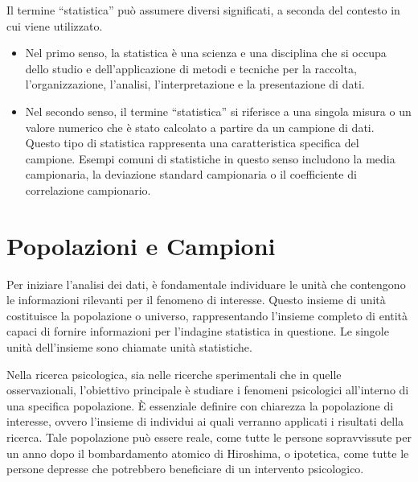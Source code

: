 \documentclass[
  letterpaper,
  krantz2]{{[}./krantz{]}}
\providecommand{\tightlist}{%
  \setlength{\itemsep}{0pt}\setlength{\parskip}{0pt}}\usepackage{longtable,booktabs,array}
\begin{document}
\begin{tcolorbox}[enhanced jigsaw, opacityback=0, breakable, left=2mm, opacitybacktitle=0.6, coltitle=black, rightrule=.15mm, colbacktitle=quarto-callout-note-color!10!white, colframe=quarto-callout-note-color-frame, toprule=.15mm, bottomtitle=1mm, toptitle=1mm, leftrule=.75mm, titlerule=0mm, title=\textcolor{quarto-callout-note-color}{\faInfo}\hspace{0.5em}{Statistica}, arc=.35mm, bottomrule=.15mm, colback=white]

Il termine ``statistica'' può assumere diversi significati, a seconda
del contesto in cui viene utilizzato.

\begin{itemize}
\tightlist
\item
  Nel primo senso, la statistica è una scienza e una disciplina che si
  occupa dello studio e dell'applicazione di metodi e tecniche per la
  raccolta, l'organizzazione, l'analisi, l'interpretazione e la
  presentazione di dati.
\item
  Nel secondo senso, il termine ``statistica'' si riferisce a una
  singola misura o un valore numerico che è stato calcolato a partire da
  un campione di dati. Questo tipo di statistica rappresenta una
  caratteristica specifica del campione. Esempi comuni di statistiche in
  questo senso includono la media campionaria, la deviazione standard
  campionaria o il coefficiente di correlazione campionario.
\end{itemize}

\end{tcolorbox}

\section{Popolazioni e Campioni}\label{popolazioni-e-campioni}

Per iniziare l'analisi dei dati, è fondamentale individuare le unità che
contengono le informazioni rilevanti per il fenomeno di interesse.
Questo insieme di unità costituisce la popolazione o universo,
rappresentando l'insieme completo di entità capaci di fornire
informazioni per l'indagine statistica in questione. Le singole unità
dell'insieme sono chiamate unità statistiche.

Nella ricerca psicologica, sia nelle ricerche sperimentali che in quelle
osservazionali, l'obiettivo principale è studiare i fenomeni psicologici
all'interno di una specifica popolazione. È essenziale definire con
chiarezza la popolazione di interesse, ovvero l'insieme di individui ai
quali verranno applicati i risultati della ricerca. Tale popolazione può
essere reale, come tutte le persone sopravvissute per un anno dopo il
bombardamento atomico di Hiroshima, o ipotetica, come tutte le persone
depresse che potrebbero beneficiare di un intervento psicologico.
\end{document}
